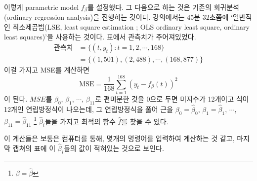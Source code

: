 \documentclass{article}
\begin{document}
이렇게 parametric model \(f_\beta\)를 설정했다.
그 다음으로 하는 것은 기존의 회귀분석(ordinary regression analysis)을 진행하는 것이다.
강의에서는 45분 32초쯤에 `일반적인 최소제곱법(LSE, least square estimation ; OLS ordinary least square, ordinary least squares)'을 사용하는 것이다.
표에서 관측치가 주어져있었다.
\begin{align*}
\text{관측치}
&=\{(t,y_t):t=1,2,\cdots,168\}\\
&=\{(1,501), (2,488),\cdots,(168,877)\}
\end{align*}
이걸 가지고 MSE를 계산하면
\[\text{MSE}=\frac1{168}\sum_{t=1}^{168}\left(y_t-f_\beta(t)\right)^2\]
이 된다.
\(MSE\)를 \(\beta_0\), \(\beta_1\), \(\cdots\), \(\beta_{11}\)로 편미분한 것을 0으로 두면 미지수가 12개이고 식이 12개인 연립방정식이 나오는데, 그 연립방정식을 풀어 근을 \(\beta_0=\hat\beta_0\), \(\beta_1=\hat\beta_1\), \(\cdots\), \(\beta_{11}=\hat\beta_{11}\) \footnote{\(\beta=\hat\beta\)} \(\hat\beta_i\)들을 가지고 최적의 함수 \(\hat f\)를 찾을 수 있다.

이 계산들은 보통은 컴퓨터를 통해, 몇개의 명령어를 입력하여 계산하는 것 같고, 마지막 캡쳐의 표에 이 \(\hat\beta_i\)들의 값이 적혀있는 것으로 보인다.

\end{document}
